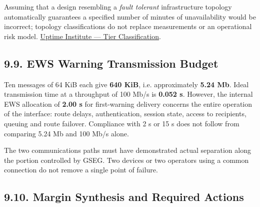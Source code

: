 Assuming that a design resembling a \emph{fault tolerant} infrastructure topology automatically guarantees a specified number of minutes of unavailability would be incorrect; topology classifications do not replace measurements or an operational risk model. \href{https://journal.uptimeinstitute.com/explaining-uptime-institutes-tier-classification-system/}{Uptime Institute — Tier Classification}.

\subsection{9.9. EWS Warning Transmission Budget}\label{ddjf-9-9}

Ten messages of 64 KiB each give \textbf{640 KiB}, i.e. approximately \textbf{5.24 Mb}. Ideal transmission time at a throughput of 100 Mb/\allowbreak{}s is \textbf{0.052 s}. However, the internal EWS allocation of \textbf{2.00 s} for first-warning delivery concerns the entire operation of the interface: route delays, authentication, session state, access to recipients, queuing and route failover. Compliance with 2 s or 15 s does not follow from comparing 5.24 Mb and 100 Mb/\allowbreak{}s alone.

The two communications paths must have demonstrated actual separation along the portion controlled by GSEG. Two devices or two operators using a common connection do not remove a single point of failure.

\subsection{9.10. Margin Synthesis and Required Actions}\label{ddjf-9-10}

